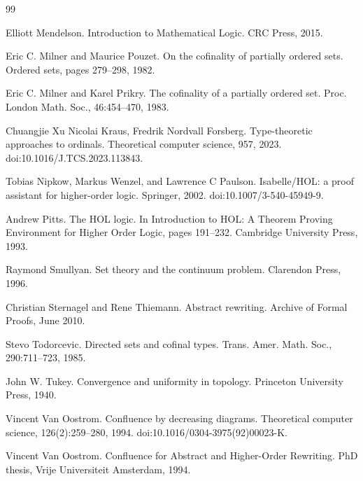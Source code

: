 \documentclass[10pt,a4paper]{amsart}
\begin{document}
\begin{thebibliography}{99}
\par\noindent  [30]  Elliott Mendelson.  Introduction to Mathematical Logic.  CRC Press, 2015.  
 
\par\noindent  [31]  Eric C. Milner and Maurice Pouzet.  On the cofinality of partially ordered sets.  Ordered sets, pages 279–298, 1982.  
 
\par\noindent  [32]  Eric C. Milner and Karel Prikry.  The cofinality of a partially ordered set.  Proc. London Math. Soc., 46:454–470, 1983.  
 
\par\noindent  [33]  Chuangjie Xu Nicolai Kraus, Fredrik Nordvall Forsberg.  Type-theoretic approaches to ordinals.  Theoretical computer science, 957, 2023.  doi:10.1016/J.TCS.2023.113843.  
 
\par\noindent  [34]  Tobias Nipkow, Markus Wenzel, and Lawrence C Paulson.  Isabelle/HOL: a proof assistant for higher-order logic.  Springer, 2002.  doi:10.1007/3-540-45949-9.  
 
\par\noindent  [35]  Andrew Pitts.  The HOL logic.  In Introduction to HOL: A Theorem Proving Environment for Higher Order Logic, pages 191–232. Cambridge University Press, 1993.  
 
\par\noindent  [36]  Raymond Smullyan.  Set theory and the continuum problem.  Clarendon Press, 1996.  
 
\par\noindent  [37]  Christian Sternagel and Rene Thiemann.  Abstract rewriting.  Archive of Formal Proofs, June 2010.  
 
\par\noindent  [38]  Stevo Todorcevic.  Directed sets and cofinal types.  Trans. Amer. Math. Soc., 290:711–723, 1985.  
 
\par\noindent  [39]  John W. Tukey.  Convergence and uniformity in topology.  Princeton University Press, 1940.  
 
\par\noindent  [40]  Vincent Van Oostrom.  Confluence by decreasing diagrams.  Theoretical computer science, 126(2):259–280, 1994.  doi:10.1016/0304-3975(92)00023-K.  
 
\par\noindent  [41]  Vincent Van Oostrom.  Confluence for Abstract and Higher-Order Rewriting.  PhD thesis, Vrije Universiteit Amsterdam, 1994.  
 

\end{thebibliography}
\end{document}
